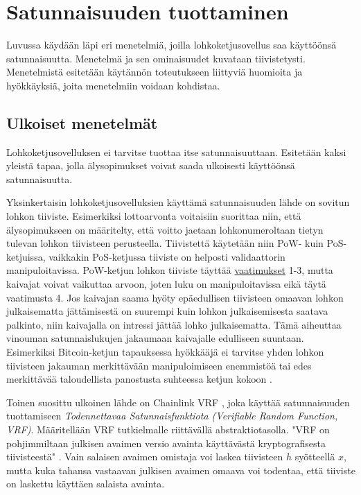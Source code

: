 \chapter{Satunnaisuuden tuottaminen\label{results}}

Luvussa käydään läpi eri menetelmiä, joilla lohkoketjusovellus saa käyttöönsä satunnaisuutta. Menetelmä ja sen ominaisuudet kuvataan tiivistetysti. Menetelmistä esitetään käytännön toteutukseen liittyviä huomioita ja hyökkäyksiä, joita menetelmiin voidaan kohdistaa.

\section{Ulkoiset menetelmät}

Lohkoketjusovelluksen ei tarvitse tuottaa itse satunnaisuuttaan. Esitetään kaksi yleistä tapaa, jolla älysopimukset voivat saada ulkoisesti käyttöönsä satunnaisuutta.

Yksinkertaisin lohkoketjusovelluksien käyttämä satunnaisuuden lähde on sovitun lohkon tiiviste. Esimerkiksi lottoarvonta voitaisiin suorittaa niin, että älysopimukseen on määritelty, että voitto jaetaan lohkonumeroltaan tietyn tulevan lohkon tiivisteen perusteella. Tiivistettä käytetään niin PoW- kuin PoS-ketjuissa, vaikkakin PoS-ketjussa tiiviste on helposti validaattorin manipuloitavissa. PoW-ketjun lohkon tiiviste täyttää \hyperref[vaatimukset]{vaatimukset} 1-3, mutta kaivajat voivat vaikuttaa arvoon, joten luku on manipuloitavissa eikä täytä vaatimusta 4. Jos kaivajan saama hyöty epäedullisen tiivisteen omaavan lohkon julkaisematta jättämisestä on suurempi kuin lohkon julkaisemisesta saatava palkinto, niin kaivajalla on intressi jättää lohko julkaisematta. Tämä aiheuttaa vinouman satunnaislukujen jakaumaan kaivajalle edulliseen suuntaan. Esimerkiksi Bitcoin-ketjun tapauksessa hyökkääjä ei tarvitse yhden lohkon tiivisteen jakauman merkittävään manipuloimiseen enemmistöä tai edes merkittävää taloudellista panostusta suhteessa ketjun kokoon \cite{pierrot_malleability_2018}.

Toinen suosittu ulkoinen lähde on Chainlink VRF \cite{noauthor_chainlink_nodate}, joka käyttää satunnaisuuden tuottamiseen \textit{Todennettavaa Satunnaisfunktiota (Verifiable Random Function, VRF)}. Määritellään VRF tutkielmalle riittävällä abstraktiotasolla. "VRF on pohjimmiltaan julkisen avaimen versio avainta käyttävästä kryptografisesta tiivisteestä" \cite{papadopoulos2017making}. Vain salaisen avaimen omistaja voi laskea tiivisteen $h$ syötteellä $x$, mutta kuka tahansa vastaavan julkisen avaimen omaava voi todentaa, että tiiviste on laskettu käyttäen salaista avainta. 

